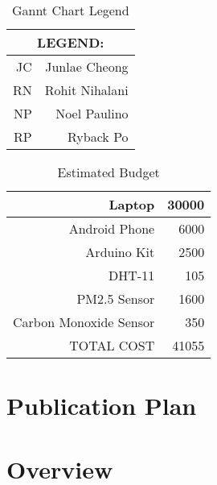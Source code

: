 \begin{table}[htbp]
  \centering
  \caption{Gannt Chart Legend}
    \begin{tabular}{rr}
    \toprule
    \multicolumn{2}{c}{LEGEND:} \\
    \midrule
    JC & Junlae Cheong \\
    RN & Rohit Nihalani \\
    NP & Noel Paulino \\
    RP & Ryback Po \\
    \bottomrule
    \end{tabular}%
  \label{tab:addlabel}%
\end{table}%

\begin{table}[htbp]
  \centering
  \caption{Estimated Budget}
    \begin{tabular}{rr}
    \toprule
    Laptop & 30000 \\
    \midrule
    Android Phone & 6000 \\
    Arduino Kit & 2500 \\
    DHT-11 & 105 \\
    PM2.5 Sensor & 1600 \\
    Carbon Monoxide Sensor & 350 \\
    TOTAL COST & 41055 \\
    \bottomrule
    \end{tabular}%
  \label{tab:addlabel}%
\end{table}%

\ifFinished
\else


\section{Publication Plan}
\blindtext

\fi


\section{Overview}

